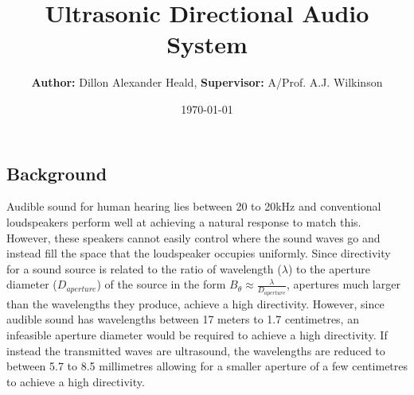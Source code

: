 \documentclass[final,32pt]{beamer}
\title
[Dillon Alexander Heald, University of Cape Town, dillon.heald@gmail.com] %
{ %
Ultrasonic Directional Audio System
}
\author{ %
\textbf{Author:} Dillon Alexander Heald\inst{1}, \textbf{Supervisor:} A/Prof. A.J. Wilkinson\inst{2}
}
\institute
[University of Cape Town] %
{
\inst{1} \textbf{Contact:} dillon.heald@gmail.com
\inst{1,}\inst{2} Dept. of Electrical Engineering, University of Cape Town
}
\date{\today}
\begin{document}
\begin{frame}[t]
\begin{multicols}{3}

\section{Background}
Audible sound for human hearing lies between 20 to 20kHz and conventional loudspeakers perform well at achieving a natural response to match this. However, these speakers cannot easily control where the sound waves go and instead fill the space that the loudspeaker occupies uniformly. Since directivity for a sound source is related to the ratio of wavelength ($\lambda$) to the aperture diameter ($D_{aperture}$) of the source in the form $B_\theta \approx \frac{\lambda}{D_{aperture}}$, apertures much larger than the wavelengths they produce, achieve a high directivity. However, since audible sound has wavelengths between 17 meters to 1.7 centimetres, an infeasible aperture diameter would be required to achieve a high directivity. If instead the transmitted waves are ultrasound, the wavelengths are reduced to between 5.7 to 8.5 millimetres allowing for a smaller aperture of a few centimetres to achieve a high directivity.

\end{multicols}
\end{frame}
\end{document}
